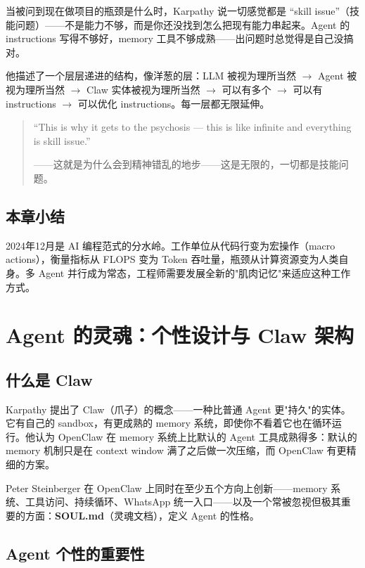 \documentclass[a4paper]{article}
\begin{document}
当被问到现在做项目的瓶颈是什么时，Karpathy 说一切感觉都是 ``skill issue''（技能问题）——不是能力不够，而是你还没找到怎么把现有能力串起来。Agent 的 instructions 写得不够好，memory 工具不够成熟——出问题时总觉得是自己没搞对。

他描述了一个层层递进的结构，像洋葱的层：LLM 被视为理所当然 $\rightarrow$ Agent 被视为理所当然 $\rightarrow$ Claw 实体被视为理所当然 $\rightarrow$ 可以有多个 $\rightarrow$ 可以有 instructions $\rightarrow$ 可以优化 instructions。每一层都无限延伸。

\begin{quote}
``This is why it gets to the psychosis — this is like infinite and everything is skill issue.''

——这就是为什么会到精神错乱的地步——这是无限的，一切都是技能问题。
\end{quote}

\subsection{本章小结}

2024年12月是 AI 编程范式的分水岭。工作单位从代码行变为宏操作（macro actions），衡量指标从 FLOPS 变为 Token 吞吐量，瓶颈从计算资源变为人类自身。多 Agent 并行成为常态，工程师需要发展全新的"肌肉记忆"来适应这种工作方式。


\section{Agent 的灵魂：个性设计与 Claw 架构}

\subsection{什么是 Claw}

Karpathy 提出了 Claw（爪子）的概念——一种比普通 Agent 更"持久"的实体。它有自己的 sandbox，有更成熟的 memory 系统，即使你不看着它也在循环运行。他认为 OpenClaw 在 memory 系统上比默认的 Agent 工具成熟得多：默认的 memory 机制只是在 context window 满了之后做一次压缩，而 OpenClaw 有更精细的方案。

Peter Steinberger 在 OpenClaw 上同时在至少五个方向上创新——memory 系统、工具访问、持续循环、WhatsApp 统一入口——以及一个常被忽视但极其重要的方面：\textbf{SOUL.md}（灵魂文档），定义 Agent 的性格。

\subsection{Agent 个性的重要性}
\end{document}

